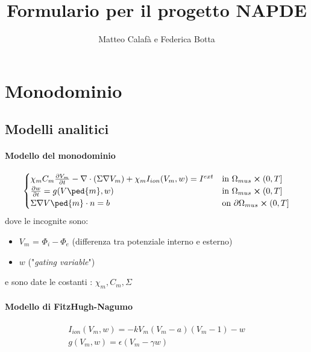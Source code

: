 \documentclass[a4paper]{article}
\theoremstyle{definition}
\begin{document}
\title{Formulario per il progetto NAPDE}
\author{Matteo Calafà e Federica Botta}
\maketitle
\vspace{5mm}
\section{Monodominio}
\vspace{5mm}
\subsection{Modelli analitici}
\vspace{5mm}
\paragraph{Modello del monodominio}
	\begin{equation}
	\begin{cases}
	\chi_m C_m\pdv{V_m}{t} - \nabla \cdot (\Sigma \nabla V_m) + \chi_m I_{ion}(V_m,w) = I^{ext}    & \text{in } \Omega_{mus} \cross (0,T]
	\\
	\pdv{w}{t} = g(V\ped{m}, w)  & \text{in } \Omega_{mus} \cross (0,T]
	\\
	\Sigma\nabla V\ped{m} \cdot n = b   & \text{on } \partial \Omega_{mus} \cross (0,T]
	\end{cases}
	\end{equation}
	\vspace{4mm}\newline
	dove le incognite sono:
	\begin{itemize}
		\item $V_m$ = $\Phi_i - \Phi_e$ (differenza tra potenziale interno e esterno)
		\item $w$  ("\emph{gating variable}")
	\end{itemize}
    e sono date le costanti : $\chi_m, C_m, \Sigma$



\paragraph{Modello di FitzHugh-Nagumo}
\begin{equation}
\begin{gathered}
I_{ion}(V_m, w) = -kV_m(V_m-a)(V_m-1) -w
\\
g(V_m,w) = \epsilon(V_m -\gamma w)
\end{gathered}
\end{equation}
\end{document}

